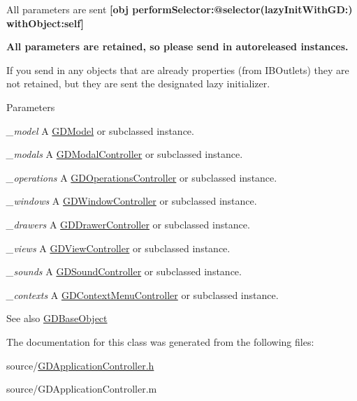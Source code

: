 All parameters are sent {\bfseries \mbox{[}obj performSelector:@selector(lazyInitWithGD:) withObject:self\mbox{]}}

{\bfseries All parameters are retained, so please send in autoreleased instances.}

If you send in any objects that are already properties (from IBOutlets) they are not retained, but they are sent the designated lazy initializer.


\begin{DoxyParams}{Parameters}
\item[{\em \_\-model}]A \hyperlink{interface_g_d_model}{GDModel} or subclassed instance. \item[{\em \_\-modals}]A \hyperlink{interface_g_d_modal_controller}{GDModalController} or subclassed instance. \item[{\em \_\-operations}]A \hyperlink{interface_g_d_operations_controller}{GDOperationsController} or subclassed instance. \item[{\em \_\-windows}]A \hyperlink{interface_g_d_window_controller}{GDWindowController} or subclassed instance. \item[{\em \_\-drawers}]A \hyperlink{interface_g_d_drawer_controller}{GDDrawerController} or subclassed instance. \item[{\em \_\-views}]A \hyperlink{interface_g_d_view_controller}{GDViewController} or subclassed instance. \item[{\em \_\-sounds}]A \hyperlink{interface_g_d_sound_controller}{GDSoundController} or subclassed instance. \item[{\em \_\-contexts}]A \hyperlink{interface_g_d_context_menu_controller}{GDContextMenuController} or subclassed instance.\end{DoxyParams}
\begin{DoxySeeAlso}{See also}
\hyperlink{interface_g_d_base_object}{GDBaseObject} 
\end{DoxySeeAlso}


The documentation for this class was generated from the following files:\begin{DoxyCompactItemize}
\item 
source/\hyperlink{_g_d_application_controller_8h}{GDApplicationController.h}\item 
source/GDApplicationController.m\end{DoxyCompactItemize}
